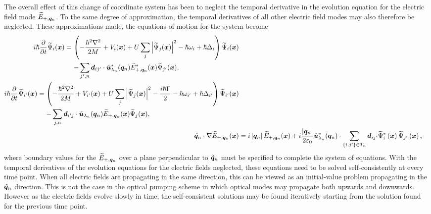 The overall effect of this change of coordinate system has been to neglect the temporal derivative in the evolution equation for the electric field mode $\widetilde{E}_{+, \bm{q}_n}$.  To the same degree of approximation, the temporal derivatives of all other electric field modes may also therefore be neglected.  These approximations made, the equations of motion for the system become
\begin{subequations}
    \begin{align}
        \begin{split}
            i \hbar \frac{\partial}{\partial t} \widetilde{\Psi}_i(\vect{x}) &= \left( -\frac{\hbar^2 \nabla^2}{2M} + V_i(\vect{x}) + U \sum_j \abs{\widetilde{\Psi}_j(\vect{x})}^2 - \hbar \omega_{i} + \hbar \Delta_i \right) \widetilde{\Psi}_i(\vect{x})\\
            &\relphantom{=} - \sum_{j',n} \vect{d}_{ij'} \cdot \unitvec{u}^*_{\lambda_n}(\vect{q}_n) \widetilde{E}_{+,\vect{q}_n}^*(\vect{x}) \widetilde{\Psi}_{j'}(\vect{x}),
        \end{split}\\
        \begin{split}
            i \hbar \frac{\partial}{\partial t} \widetilde{\Psi}_{i'}(\vect{x}) &= \left( -\frac{\hbar^2 \nabla^2}{2M} + V_{i'}(\vect{x}) + U \sum_j \abs{\widetilde{\Psi}_j(\vect{x})}^2 - \frac{i\hbar \Gamma}{2} - \hbar \omega_{i'} + \hbar \Delta_{i'}\right) \widetilde{\Psi}_{i'}(\vect{x})\\
            &\relphantom{=} - \sum_{j,n} \vect{d}_{i'j} \cdot \unitvec{u}_{\lambda_n}(\vect{q}_n) \widetilde{E}_{+,\vect{q}_n}(\vect{x}) \widetilde{\Psi}_{j}(\vect{x}),
        \end{split} \label{OpticalPumping:AtomicExcitedStateEvolution}\\
      \unitvec{q}_n \cdot \nabla \widetilde{E}_{+, \vect{q}_n}(\vect{x}) &= i \abs{\vect{q}_n} \widetilde{E}_{+, \vect{q}_n}(\vect{x}) + i \frac{\abs{\vect{q}_n}}{2 \varepsilon_0} \unitvec{u}^*_{\lambda_n}(\vect{q}_n) \cdot \sum_{\{i,j'\}\in T_n} \vect{d}_{ij'} \widetilde{\Psi}^*_i\left(\vect{x}\right) \widetilde{\Psi}_{j'}\left(\vect{x}\right),
    \end{align}
\end{subequations}
where boundary values for the $\widetilde{E}_{+, \bm{q}_n}$ over a plane perpendicular to $\check{\bm{q}}_n$ must be specified to complete the system of equations.  With the temporal derivatives of the evolution equations for the electric fields neglected, these equations need to be solved self-consistently at every time point.  When all electric fields are propagating in the same direction, this can be viewed as an initial-value problem propagating in the $\check{\bm{q}}_n$ direction.  This is not the case in the optical pumping scheme in which optical modes may propagate both upwards and downwards.  However as the electric fields evolve slowly in time, the self-consistent solutions may be found iteratively starting from the solution found for the previous time point.

